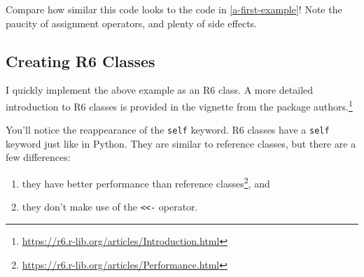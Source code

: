 \documentclass[
  12pt,
  krantz2]{krantz}
\providecommand{\tightlist}{%
  \setlength{\itemsep}{0pt}\setlength{\parskip}{0pt}}
\renewcommand{\href}[2]{#2\footnote{\url{#1}}}
\begin{document}
Compare how similar this code looks to the code in \ref{a-first-example}! Note the paucity of assignment operators, and plenty of side effects.

\hypertarget{creating-r6-classes}{%
\subsection{Creating R6 Classes}\label{creating-r6-classes}}

I quickly implement the above example as an R6 class. A more detailed introduction to R6 classes is provided in \href{https://r6.r-lib.org/articles/Introduction.html}{the vignette from the package authors.}

You'll notice the reappearance of the \texttt{self} keyword. R6 classes have a \texttt{self} keyword just like in Python. They are similar to reference classes, but there are a few differences:

\begin{enumerate}
\def\labelenumi{\arabic{enumi}.}
\tightlist
\item
  they have \href{https://r6.r-lib.org/articles/Performance.html}{better performance than reference classes}, and
\item
  they don't make use of the \texttt{\textless{}\textless{}-} operator.
\end{enumerate}
\end{document}
